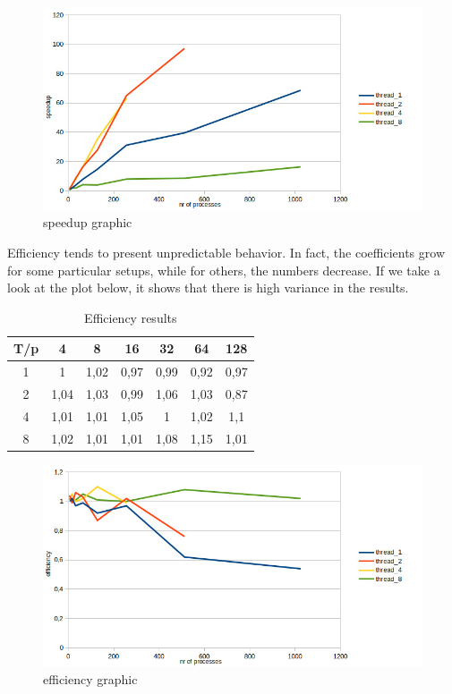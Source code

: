 \documentclass[10pt]{article}
\begin{document}
\begin{multicols}{2}
\begin{figure}[H]
  \includegraphics[scale=0.3]{img/speedup.jpg}
  \centering
  \caption{speedup graphic}
\end{figure}

\noindent 
Efficiency tends to present unpredictable behavior.
In fact, the coefficients grow for some particular setups,
while for others, the numbers decrease. If we take a look at
the plot below, it shows that there is high variance in the results.
\begin{table}[H]
\centering
\begin{tabular}{| c | c | c | c | c | c | c |}
  \hline
  T/p & 4	 & 8	& 16	& 32	& 64 & 128  \\
  \hline
  1 & 1	& 1,02 & 0,97 & 0,99 & 0,92 & 0,97  \\
  2 & 1,04 & 1,03 & 0,99 & 1,06 & 1,03 & 0,87 \\	
  4 & 1,01	&1,01&	1,05&	1&	1,02&	1,1	\\	
  8 &1,02&	1,01&	1,01&	1,08&	1,15&	1,01 \\
  \hline
\end{tabular}
\caption{Efficiency results}
\label{efficiency_results}
\end{table}

\begin{figure}[H]
  \includegraphics[scale=0.3]{img/efficiency.jpg}
  \centering
  \caption{efficiency graphic}
\end{figure}



\end{multicols}
\end{document}
